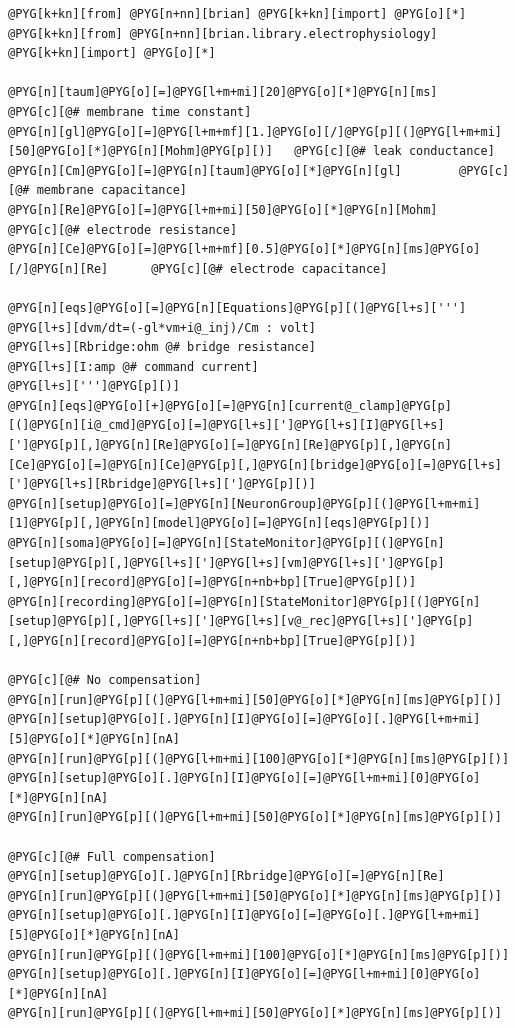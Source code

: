 \documentclass[letterpaper,10pt,english]{manual}
\begin{document}
\begin{Verbatim}[commandchars=@\[\]]
@PYG[k+kn][from] @PYG[n+nn][brian] @PYG[k+kn][import] @PYG[o][*]
@PYG[k+kn][from] @PYG[n+nn][brian.library.electrophysiology] @PYG[k+kn][import] @PYG[o][*]

@PYG[n][taum]@PYG[o][=]@PYG[l+m+mi][20]@PYG[o][*]@PYG[n][ms]        @PYG[c][@# membrane time constant]
@PYG[n][gl]@PYG[o][=]@PYG[l+m+mf][1.]@PYG[o][/]@PYG[p][(]@PYG[l+m+mi][50]@PYG[o][*]@PYG[n][Mohm]@PYG[p][)]   @PYG[c][@# leak conductance]
@PYG[n][Cm]@PYG[o][=]@PYG[n][taum]@PYG[o][*]@PYG[n][gl]        @PYG[c][@# membrane capacitance]
@PYG[n][Re]@PYG[o][=]@PYG[l+m+mi][50]@PYG[o][*]@PYG[n][Mohm]        @PYG[c][@# electrode resistance]
@PYG[n][Ce]@PYG[o][=]@PYG[l+m+mf][0.5]@PYG[o][*]@PYG[n][ms]@PYG[o][/]@PYG[n][Re]      @PYG[c][@# electrode capacitance]

@PYG[n][eqs]@PYG[o][=]@PYG[n][Equations]@PYG[p][(]@PYG[l+s][''']
@PYG[l+s][dvm/dt=(-gl*vm+i@_inj)/Cm : volt]
@PYG[l+s][Rbridge:ohm @# bridge resistance]
@PYG[l+s][I:amp @# command current]
@PYG[l+s][''']@PYG[p][)]
@PYG[n][eqs]@PYG[o][+]@PYG[o][=]@PYG[n][current@_clamp]@PYG[p][(]@PYG[n][i@_cmd]@PYG[o][=]@PYG[l+s][']@PYG[l+s][I]@PYG[l+s][']@PYG[p][,]@PYG[n][Re]@PYG[o][=]@PYG[n][Re]@PYG[p][,]@PYG[n][Ce]@PYG[o][=]@PYG[n][Ce]@PYG[p][,]@PYG[n][bridge]@PYG[o][=]@PYG[l+s][']@PYG[l+s][Rbridge]@PYG[l+s][']@PYG[p][)]
@PYG[n][setup]@PYG[o][=]@PYG[n][NeuronGroup]@PYG[p][(]@PYG[l+m+mi][1]@PYG[p][,]@PYG[n][model]@PYG[o][=]@PYG[n][eqs]@PYG[p][)]
@PYG[n][soma]@PYG[o][=]@PYG[n][StateMonitor]@PYG[p][(]@PYG[n][setup]@PYG[p][,]@PYG[l+s][']@PYG[l+s][vm]@PYG[l+s][']@PYG[p][,]@PYG[n][record]@PYG[o][=]@PYG[n+nb+bp][True]@PYG[p][)]
@PYG[n][recording]@PYG[o][=]@PYG[n][StateMonitor]@PYG[p][(]@PYG[n][setup]@PYG[p][,]@PYG[l+s][']@PYG[l+s][v@_rec]@PYG[l+s][']@PYG[p][,]@PYG[n][record]@PYG[o][=]@PYG[n+nb+bp][True]@PYG[p][)]

@PYG[c][@# No compensation]
@PYG[n][run]@PYG[p][(]@PYG[l+m+mi][50]@PYG[o][*]@PYG[n][ms]@PYG[p][)]
@PYG[n][setup]@PYG[o][.]@PYG[n][I]@PYG[o][=]@PYG[o][.]@PYG[l+m+mi][5]@PYG[o][*]@PYG[n][nA]
@PYG[n][run]@PYG[p][(]@PYG[l+m+mi][100]@PYG[o][*]@PYG[n][ms]@PYG[p][)]
@PYG[n][setup]@PYG[o][.]@PYG[n][I]@PYG[o][=]@PYG[l+m+mi][0]@PYG[o][*]@PYG[n][nA]
@PYG[n][run]@PYG[p][(]@PYG[l+m+mi][50]@PYG[o][*]@PYG[n][ms]@PYG[p][)]

@PYG[c][@# Full compensation]
@PYG[n][setup]@PYG[o][.]@PYG[n][Rbridge]@PYG[o][=]@PYG[n][Re]
@PYG[n][run]@PYG[p][(]@PYG[l+m+mi][50]@PYG[o][*]@PYG[n][ms]@PYG[p][)]
@PYG[n][setup]@PYG[o][.]@PYG[n][I]@PYG[o][=]@PYG[o][.]@PYG[l+m+mi][5]@PYG[o][*]@PYG[n][nA]
@PYG[n][run]@PYG[p][(]@PYG[l+m+mi][100]@PYG[o][*]@PYG[n][ms]@PYG[p][)]
@PYG[n][setup]@PYG[o][.]@PYG[n][I]@PYG[o][=]@PYG[l+m+mi][0]@PYG[o][*]@PYG[n][nA]
@PYG[n][run]@PYG[p][(]@PYG[l+m+mi][50]@PYG[o][*]@PYG[n][ms]@PYG[p][)]


\end{Verbatim}
\end{document}
